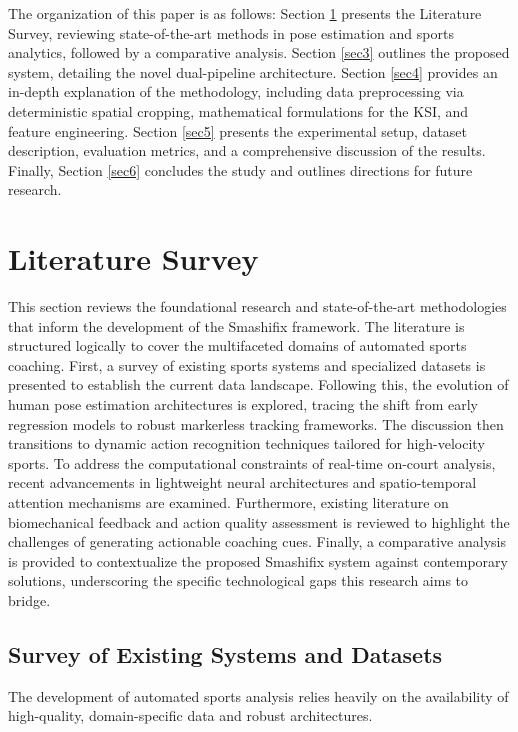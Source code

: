 \documentclass[pdflatex,sn-mathphys-num]{sn-jnl}
\theoremstyle{thmstyleone}%
\theoremstyle{thmstyletwo}%
\theoremstyle{thmstylethree}%
\begin{document}
The organization of this paper is as follows: Section \ref{sec2} presents the Literature Survey, reviewing state-of-the-art methods in pose estimation and sports analytics, followed by a comparative analysis. Section \ref{sec3} outlines the proposed system, detailing the novel dual-pipeline architecture. Section \ref{sec4} provides an in-depth explanation of the methodology, including data preprocessing via deterministic spatial cropping, mathematical formulations for the KSI, and feature engineering. Section \ref{sec5} presents the experimental setup, dataset description, evaluation metrics, and a comprehensive discussion of the results. Finally, Section \ref{sec6} concludes the study and outlines directions for future research.


\section{Literature Survey}\label{sec2}

This section reviews the foundational research and state-of-the-art methodologies that inform the development of the Smashifix framework. The literature is structured logically to cover the multifaceted domains of automated sports coaching. First, a survey of existing sports systems and specialized datasets is presented to establish the current data landscape. Following this, the evolution of human pose estimation architectures is explored, tracing the shift from early regression models to robust markerless tracking frameworks. The discussion then transitions to dynamic action recognition techniques tailored for high-velocity sports. To address the computational constraints of real-time on-court analysis, recent advancements in lightweight neural architectures and spatio-temporal attention mechanisms are examined. Furthermore, existing literature on biomechanical feedback and action quality assessment is reviewed to highlight the challenges of generating actionable coaching cues. Finally, a comparative analysis is provided to contextualize the proposed Smashifix system against contemporary solutions, underscoring the specific technological gaps this research aims to bridge.

\subsection{Survey of Existing Systems and Datasets}
The development of automated sports analysis relies heavily on the availability of high-quality, domain-specific data and robust architectures. 
\end{document}
